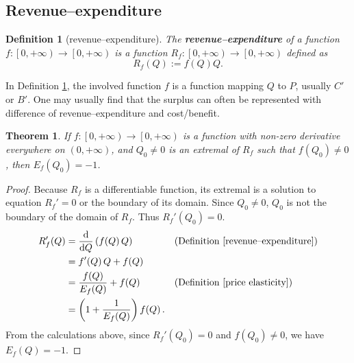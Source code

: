 \documentclass{article}
\newtheorem{theorem}{Theorem}[subsection]
\newtheorem{definition}{Definition}[subsection]
\begin{document}
\subsection{Revenue--expenditure}

\begin{definition}[revenue--expenditure]
\label{revenue--expenditure}
The \textbf{revenue--expenditure} of a function $f:\left[0,+\infty\right)\to\left[0,+\infty\right)$ is a function $R_f:\left[0,+\infty\right)\to\left[0,+\infty\right)$ defined as
$$R_f\!\left(Q\right):=f\!\left(Q\right)Q.$$
\end{definition}

In Definition \ref{revenue--expenditure}, the involved function $f$ is a function mapping $Q$ to $P$, usually $C'$ or $B'$.
One may usually find that the surplus can often be represented with difference of revenue--expenditure and cost/benefit.

\begin{theorem}
\label{price elasticity and revenue--expenditure}
If $f:\left[0,+\infty\right)\to\left[0,+\infty\right)$ is a function with non-zero derivative everywhere on $\left(0,+\infty\right)$, and $Q_0\ne0$ is an extremal of $R_f$ such that $f\!\left(Q_0\right)\ne0$, then $E_f\!\left(Q_0\right)=-1$.
\end{theorem}
\begin{proof}
Because $R_f$ is a differentiable function, its extremal is a solution to equation $R_f'=0$ or the boundary of its domain.
Since $Q_0\ne0$, $Q_0$ is{} not the boundary of the domain of $R_f$.
Thus $R_f'\!\left(Q_0\right)=0$.
\begin{align*}
R_f'\!\left(Q\right)&=\frac{\mathrm d}{\mathrm dQ}\left(f\!\left(Q\right)Q\right)&&\text{(Definition \ref{revenue--expenditure})}\\
&=f'\!\left(Q\right)Q+f\!\left(Q\right)\\
&=\frac{f\!\left(Q\right)}{E_f\!\left(Q\right)}+f\!\left(Q\right)&&\text{(Definition \ref{price elasticity})}\\
&=\left(1+\frac1{E_f\!\left(Q\right)}\right)f\!\left(Q\right).
\end{align*}
From the calculations above, since $R_f'\!\left(Q_0\right)=0$ and $f\!\left(Q_0\right)\ne0$, we have $E_f\!\left(Q\right)=-1$.
\end{proof}
\end{document}

